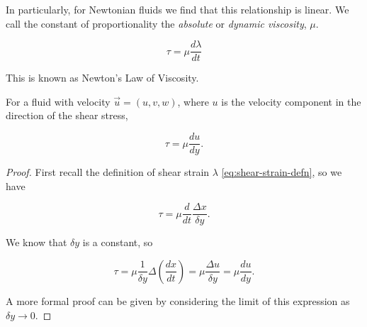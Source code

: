 In particularly, for Newtonian fluids we find that this relationship is linear. We call the constant of proportionality the \textit{absolute} or \textit{dynamic viscosity}, $\mu$.

\begin{equation} \label{eq:newtons-law-of-viscosity-lambda}
  \tau = \mu \frac{ d \lambda }{ d t }
\end{equation}

This is known as Newton's Law of Viscosity.

\begin{proposition}
  For a fluid with velocity $\vec{u} = (u,v,w)$, where $u$ is the velocity component in the direction of the shear stress,

  \begin{equation*}
    \tau = \mu \frac{ d u }{ d y }.
  \end{equation*}
\end{proposition}

\begin{proof}
  First recall the definition of shear strain $\lambda$ \eqref{eq:shear-strain-defn}, so we have

  \begin{equation}
    \tau = \mu \frac{d}{ dt } \frac{ \Delta x }{ \delta y }.
  \end{equation}

  We know that $\delta y$ is a constant, so

  \begin{equation}
    \tau = \mu \frac{1 }{ \delta y } \Delta \left(\frac{ dx }{ dt }\right) = \mu \frac{ \Delta u }{ \delta y } = \mu \frac{ du }{ dy }.
  \end{equation}

  A more formal proof can be given by considering the limit of this expression as $\delta y \rightarrow 0$.
\end{proof}

